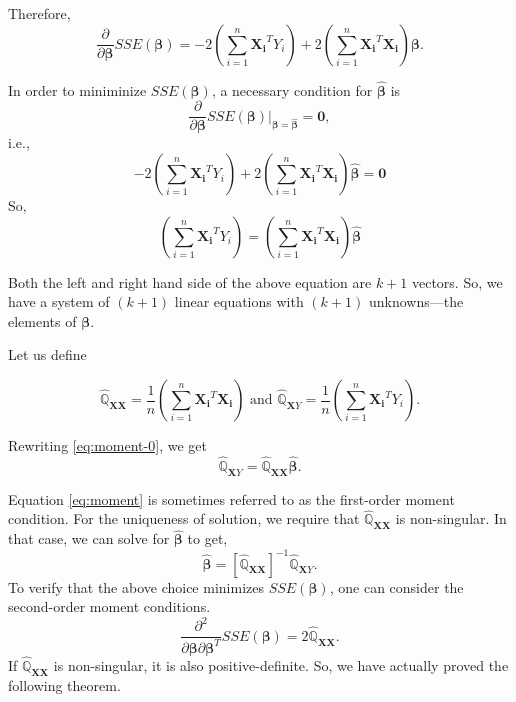 \documentclass[
]{book}
\theoremstyle{definition}
\theoremstyle{definition}
\theoremstyle{definition}
\theoremstyle{definition}
\theoremstyle{remark}
\begin{document}
Therefore,
\[
\frac{\partial}{\partial{\boldsymbol{\beta}}}SSE({\boldsymbol{\beta}})
=-2\left(\sum\limits_{i=1}^n{\boldsymbol{X_i}}^TY_i\right) 
+ 2\left(\sum\limits_{i=1}^n  {\boldsymbol{X_i}}^T{\boldsymbol{X_i}}\right){\boldsymbol{\beta}}.
\]

In order to miniminize \(SSE({\boldsymbol{\beta}})\), a necessary condition for \(\widehat{{\boldsymbol{\beta}}}\) is
\[
\frac{\partial}{\partial{\boldsymbol{\beta}}}SSE({\boldsymbol{\beta}})\bigg|_{{\boldsymbol{\beta}}
=\widehat{{\boldsymbol{\beta}}}}={\boldsymbol{0}},
\]
i.e.,
\[
-2\left(\sum\limits_{i=1}^n{\boldsymbol{X_i}}^TY_i\right) 
+ 2\left(\sum\limits_{i=1}^n  {\boldsymbol{X_i}}^T{\boldsymbol{X_i}}\right)\widehat{{\boldsymbol{\beta}}}
={\boldsymbol{0}}
\]
So,
\begin{equation}
\left(\sum\limits_{i=1}^n{\boldsymbol{X_i}}^TY_i\right)
=\left(\sum\limits_{i=1}^n  {\boldsymbol{X_i}}^T{\boldsymbol{X_i}}\right)\widehat{{\boldsymbol{\beta}}}
\label{eq:moment-0}
\end{equation}

Both the left and right hand side of the above equation are \(k+1\) vectors. So, we have a system of \((k+1)\) linear equations with \((k+1)\) unknowns---the elements of \({\boldsymbol{\beta}}\).

Let us define

\[
\widehat{\mathbb{Q}}_{{\boldsymbol{XX}}}
=\frac{1}{n}\left(\sum\limits_{i=1}^n{\boldsymbol{X_i}}^T{\boldsymbol{X_i}}\right)
\mbox{ and }
\widehat{\mathbb{Q}}_{{\boldsymbol{X}}Y}
=\frac{1}{n}\left(\sum\limits_{i=1}^n{\boldsymbol{X_i}}^TY_i\right).
\]

Rewriting \eqref{eq:moment-0}, we get
\begin{equation}
\widehat{\mathbb{Q}}_{{\boldsymbol{X}}Y}=\widehat{\mathbb{Q}}_{{\boldsymbol{XX}}}
\widehat{{\boldsymbol{\beta}}}.
\label{eq:moment}
\end{equation}

Equation \eqref{eq:moment} is sometimes referred to as the first-order moment condition. For the uniqueness of solution, we require that
\(\widehat{\mathbb{Q}}_{{\boldsymbol{XX}}}\) is non-singular. In that case, we can solve for \(\widehat{{\boldsymbol{\beta}}}\) to get,
\[
\widehat{{\boldsymbol{\beta}}}=\left[\widehat{\mathbb{Q}}_{{\boldsymbol{XX}}}\right]^{-1}
\widehat{\mathbb{Q}}_{{\boldsymbol{X}}Y}.
\]
To verify that the above choice minimizes \(SSE({\boldsymbol{\beta}})\),
one can consider the second-order moment conditions.
\[
\frac{\partial^2}{\partial{\boldsymbol{\beta}}\partial{\boldsymbol{\beta}}^T}SSE({\boldsymbol{\beta}})
=2\widehat{\mathbb{Q}}_{{\boldsymbol{XX}}}.
\]
If \(\widehat{\mathbb{Q}}_{{\boldsymbol{XX}}}\) is non-singular, it is also positive-definite. So, we have actually proved the following theorem.
\end{document}
